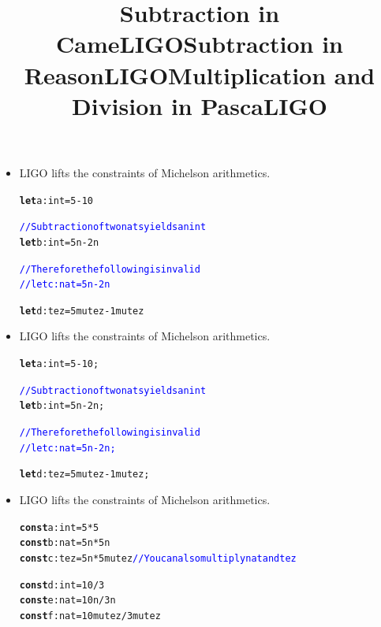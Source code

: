 \documentclass[wide]{slides}
\newcommand{\Kconst}[0]{\textbf{const}\xspace}
\newcommand{\Klet}[0]{\textbf{let}\xspace}
\newcommand{\com}[1]{\textcolor{blue}{{#1}}}
\begin{document}
\begin{slide}
  \title{Subtraction in CameLIGO}

  \begin{itemize}

    \item LIGO lifts the constraints of Michelson arithmetics.

      \begin{alltt}
\Klet a : int = 5 - 10

\com{// Subtraction of two nats yields an int}
\Klet b : int = 5n - 2n

\com{// Therefore the following is invalid}
\com{// let c : nat = 5n - 2n}

\Klet d : tez = 5mutez - 1mutez
      \end{alltt}

  \end{itemize}

\end{slide}

\begin{slide}
  \title{Subtraction in ReasonLIGO}

  \begin{itemize}

    \item LIGO lifts the constraints of Michelson arithmetics.

      \begin{alltt}
\Klet a : int = 5 - 10;

\com{// Subtraction of two nats yields an int}
\Klet b : int = 5n - 2n;

\com{// Therefore the following is invalid}
\com{// let c : nat = 5n - 2n;}

\Klet d : tez = 5mutez - 1mutez;
      \end{alltt}

  \end{itemize}

\end{slide}

\begin{slide}
  \title{Multiplication and Division in PascaLIGO}

  \begin{itemize}

    \item LIGO lifts the constraints of Michelson arithmetics.

      \begin{alltt}
\Kconst a : int = 5 * 5
\Kconst b : nat = 5n * 5n
\Kconst c : tez = 5n * 5mutez \com{// You can also multiply nat and tez}

\Kconst d : int = 10 / 3
\Kconst e : nat = 10n / 3n
\Kconst f : nat = 10mutez / 3mutez
      \end{alltt}

  \end{itemize}

\end{slide}
\end{document}
